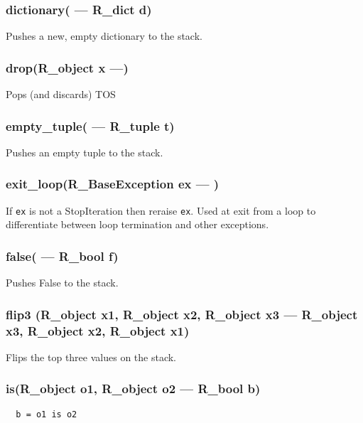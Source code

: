 \subsubsection{dictionary( --- R\_dict d)}
\vspace{-1em}Pushes a new, empty dictionary to the stack. \vspace{-1em}
\subsubsection{drop(R\_object x ---)}
\vspace{-1em}Pops (and discards) TOS \vspace{-1em}
\subsubsection{empty\_tuple( --- R\_tuple t) }
\vspace{-1em}Pushes an empty tuple to the stack. \vspace{-1em}
\subsubsection{exit\_loop(R\_BaseException ex --- )}
\vspace{-1em}If \texttt{ex} is not a StopIteration then reraise \texttt{ex}. Used at exit from a loop to differentiate between loop termination and other exceptions. \vspace{-1em}
\subsubsection{false( --- R\_bool f)}
\vspace{-1em}Pushes False to the stack. \vspace{-1em}
\subsubsection{flip3 (R\_object x1, R\_object x2, R\_object x3 --- R\_object x3, R\_object x2, R\_object x1)}
\vspace{-1em}Flips the top three values on the stack. \vspace{-1em}
\subsubsection{is(R\_object o1, R\_object o2 --- R\_bool b) }
\vspace{-1em}\begin{verbatim}
  b = o1 is o2
\end{verbatim}
\vspace{-1em}\vspace{-1em}
